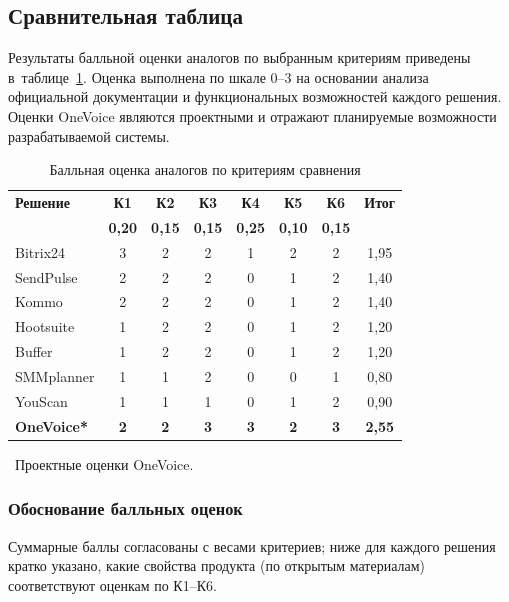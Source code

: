 \subsection{Сравнительная таблица}
\label{subsec:comparison-table}

Результаты балльной оценки аналогов по выбранным критериям приведены в~таблице~\ref{tab:analogues}. Оценка выполнена по шкале 0--3 на основании анализа официальной документации и функциональных возможностей каждого решения. Оценки OneVoice являются проектными и отражают планируемые возможности разрабатываемой системы.

\begin{table}[H]
  \caption{Балльная оценка аналогов по критериям сравнения}
  \label{tab:analogues}
  \small
  \begin{tabularx}{\textwidth}{|X|c|c|c|c|c|c|c|}
    \hline
    \textbf{Решение} & \textbf{К1} & \textbf{К2} & \textbf{К3} & \textbf{К4} & \textbf{К5} & \textbf{К6} & \textbf{Итог} \\
    \textbf{} & \textbf{0{,}20} & \textbf{0{,}15} & \textbf{0{,}15} & \textbf{0{,}25} & \textbf{0{,}10} & \textbf{0{,}15} & \\
    \hline
    Bitrix24 & 3 & 2 & 2 & 1 & 2 & 2 & 1{,}95 \\
    \hline
    SendPulse & 2 & 2 & 2 & 0 & 1 & 2 & 1{,}40 \\
    \hline
    Kommo & 2 & 2 & 2 & 0 & 1 & 2 & 1{,}40 \\
    \hline
    Hootsuite & 1 & 2 & 2 & 0 & 1 & 2 & 1{,}20 \\
    \hline
    Buffer & 1 & 2 & 2 & 0 & 1 & 2 & 1{,}20 \\
    \hline
    SMMplanner & 1 & 1 & 2 & 0 & 0 & 1 & 0{,}80 \\
    \hline
    YouScan & 1 & 1 & 1 & 0 & 1 & 2 & 0{,}90 \\
    \hline
    \textbf{OneVoice*} & \textbf{2} & \textbf{2} & \textbf{3} & \textbf{3} & \textbf{2} & \textbf{3} & \textbf{2{,}55} \\
    \hline
  \end{tabularx}
\end{table}

\noindent *~Проектные оценки OneVoice.

\subsubsection{Обоснование балльных оценок}

Суммарные баллы согласованы с весами критериев; ниже для каждого решения кратко указано, какие свойства продукта (по открытым материалам) соответствуют оценкам по К1--К6.

